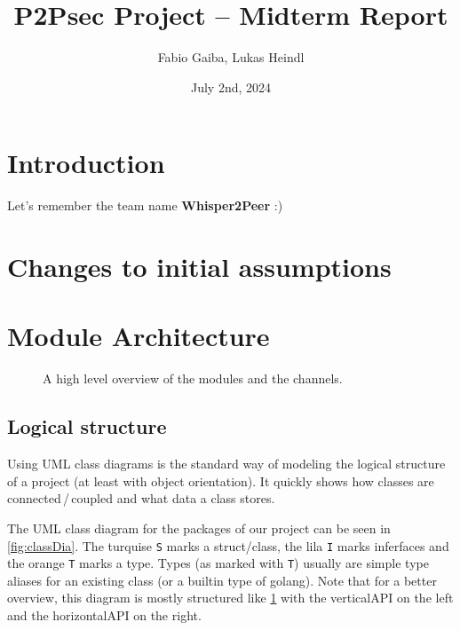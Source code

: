 \documentclass[a4paper,english,10pt,NET]{tumarticle}
\title{P2Psec Project -- Midterm Report}
\author{Fabio Gaiba, Lukas Heindl}
\date{July 2nd, 2024}
\begin{document}
\maketitle
\thispagestyle{tumarticle}

\section{Introduction}

Let's remember the team name \textbf{Whisper2Peer} :)


\section{Changes to initial assumptions}


\section{Module Architecture}

\begin{figure}
	\centering
	
	\caption{A high level overview of the modules and the channels.}
	\label{fig:overview}
\end{figure}

\subsection{Logical structure}
Using UML class diagrams is the standard way of modeling the logical structure of a project (at least with object orientation).
It quickly shows how classes are connected\,/\,coupled and what data a class stores.

The UML class diagram for the packages of our project can be seen in \cref{fig:classDia}.
The turquise \texttt{S} marks a struct/class, the lila \texttt{I} marks inferfaces and the orange \texttt{T} marks a type.
Types (as marked with \texttt{T}) usually are simple type aliases for an existing class (or a builtin type of golang).
Note that for a better overview, this diagram is mostly structured like \cref{fig:overview} with the verticalAPI on the left and the horizontalAPI on the right.
\end{document}
